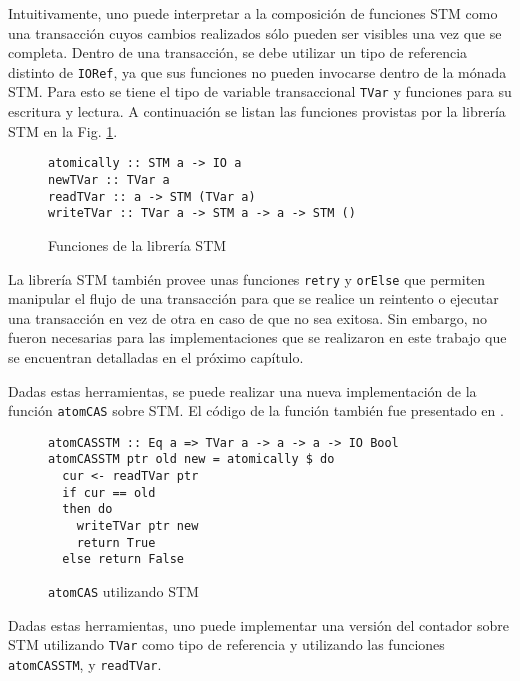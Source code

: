 Intuitivamente, uno puede interpretar a la composición de funciones STM como una transacción cuyos cambios realizados sólo pueden ser visibles una vez que se completa.
Dentro de una transacción, se debe utilizar un tipo de referencia distinto de \texttt{IORef}, ya que sus funciones no pueden invocarse dentro de la mónada STM. Para esto se tiene el tipo de variable transaccional \texttt{TVar} y funciones para su escritura y lectura.
A continuación se listan las funciones provistas por la librería STM en la Fig. \ref{fig:stm-interface}.

\begin{figure}[H]
\begin{verbatim}
atomically :: STM a -> IO a
newTVar :: TVar a
readTVar :: a -> STM (TVar a)
writeTVar :: TVar a -> STM a -> a -> STM ()
\end{verbatim}
\caption{Funciones de la librería STM}
\label{fig:stm-interface}
\end{figure}

La librería STM también provee unas funciones \texttt{retry} y \texttt{orElse} que permiten manipular el flujo de una transacción para que se realice un reintento o ejecutar una transacción en vez de otra en caso de que no sea exitosa.
Sin embargo, no fueron necesarias para las implementaciones que se realizaron en este trabajo que se encuentran detalladas en el próximo capítulo.

Dadas estas herramientas, se puede realizar una nueva implementación de la función \texttt{atomCAS} sobre STM.
El código de la función también fue presentado en \cite{linked-list}.

\begin{figure}[H]
\begin{verbatim}
atomCASSTM :: Eq a => TVar a -> a -> a -> IO Bool
atomCASSTM ptr old new = atomically $ do
  cur <- readTVar ptr
  if cur == old
  then do
    writeTVar ptr new
    return True
  else return False
\end{verbatim}
\caption{\texttt{atomCAS} utilizando STM}
\end{figure}

Dadas estas herramientas, uno puede implementar una versión del contador sobre STM utilizando \texttt{TVar} como tipo de referencia y utilizando las funciones \texttt{atomCASSTM}, y \texttt{readTVar}.


